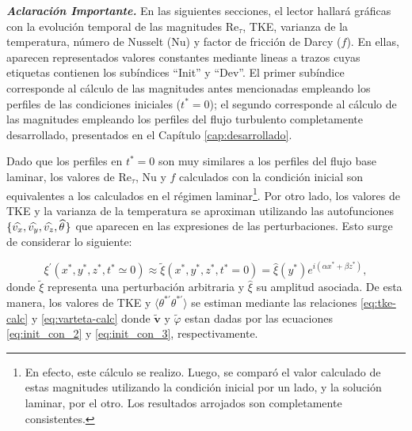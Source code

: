 \begin{table}[H]
\centering
{}
\caption{Parámetros adimensionales de los dos casos elegidos.}
\label{tab:cases}
\end{table}

\textit{\textbf{Aclaración Importante.}} En las siguientes secciones, el lector hallará gráficas con la evolución temporal de las magnitudes  Re$_{\tau}$, TKE, varianza de la temperatura, número de Nusselt (Nu) y factor de fricción de Darcy ($f$). En ellas, aparecen representados valores constantes mediante lineas a trazos cuyas etiquetas contienen los subíndices ``Init'' y ``Dev''. El primer subíndice corresponde al cálculo de las magnitudes antes mencionadas empleando los perfiles de las condiciones iniciales ($t^*=0$); el segundo corresponde al cálculo de las magnitudes empleando los perfiles del flujo turbulento completamente desarrollado, presentados en el Capítulo \ref{cap:desarrollado}. 

Dado que los perfiles en $t^*=0$ son muy similares a los perfiles del flujo base laminar, los valores de Re$_{\tau}$, Nu y $f$ calculados con la condición inicial son equivalentes a los calculados en el régimen laminar\footnote{En efecto, este cálculo se realizo. Luego, se comparó el valor calculado de estas magnitudes utilizando la condición inicial por un lado, y la solución laminar, por el otro. Los resultados arrojados son completamente consistentes.}. Por otro lado, los valores de TKE y la varianza de la temperatura se aproximan utilizando las autofunciones $\lbrace \widehat{v_x}, \widehat{v_y}, \widehat{v_z}, \widehat{\theta} \hspace{0.3mm} \rbrace$ que aparecen en las expresiones de las perturbaciones. Esto surge de considerar lo siguiente: 

$$\xi^{\prime} (x^*,y^*,z^*,t^* \simeq 0) \approx \widetilde{\xi}(x^*,y^*,z^*,t^*=0) =  \widehat{\xi}(y^*) e^{i (\alpha x^* + \beta z^*)} , $$
donde $\widetilde{\xi}$ representa una perturbación arbitraria y $\widehat{\xi}$ su amplitud asociada. De esta manera, los valores de TKE y $\langle \theta^{* \prime} \theta^{* \prime} \rangle$ se estiman mediante las relaciones \ref{eq:tke-calc} y \ref{eq:varteta-calc} donde $\widetilde{\mathbf{v}}$ y $\widetilde{\varphi}$ estan dadas por las ecuaciones \ref{eq:init_con_2} y \ref{eq:init_con_3}, respectivamente.

